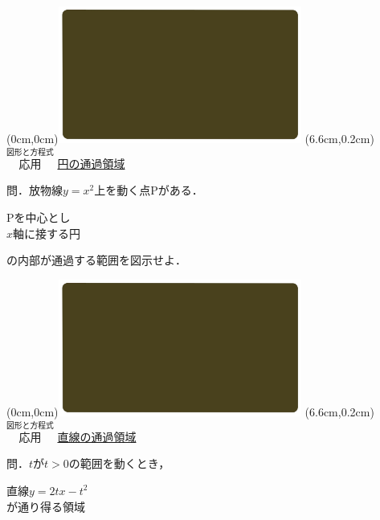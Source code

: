 \documentclass[10pt,
fleqn,
dvipdfmx,
uplatex
]{jsarticle}
\begin{document}
\bf\boldmath



\bf\boldmath

\bf\boldmath

\at(0cm,0cm){\includegraphics[width=8cm,bb=0 0 1920 1080]{./youtube/thumbnails/templates/smart_background/図形と方程式.jpeg}}
\at(6.6cm,0.2cm){\small\color{bradorange}$\overset{\text{図形と方程式}}{\text{応用}}$}
{\color{orange}\huge\underline{円の通過領域}}\vspace{0.3zw}

\large
問．放物線$y=x^2$上を動く点Pがある．

\huge
\hspace{0.0zw}
Pを中心とし\vspace{-0.2zw}\\
\hfill $x$軸に接する円\hspace{0.1zw}

\large
\vspace{0.3zw}
\hfill の内部が通過する範囲を図示せよ．

\newpage

\at(0cm,0cm){\includegraphics[width=8cm,bb=0 0 1920 1080]{./youtube/thumbnails/templates/smart_background/図形と方程式.jpeg}}
\at(6.6cm,0.2cm){\small\color{bradorange}$\overset{\text{図形と方程式}}{\text{応用}}$}
{\color{orange}\huge\underline{直線の通過領域}}\vspace{0.3zw}


\large
問．$t$が$t>0$の範囲を動くとき，

\huge
\vspace{-0.1zw}
\hspace{0.0zw}
直線\;$y=2tx-t^2$\vspace{-0.0zw}\\
\hfill が通り得る領域\hspace{0.1zw}
\end{document}

